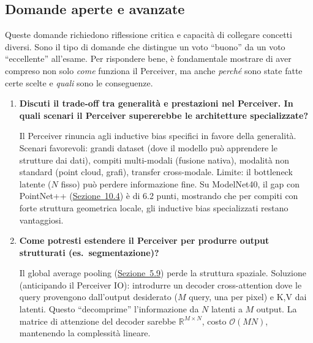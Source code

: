 \documentclass[12pt,a4paper]{article}
\begin{document}
\subsection{Domande aperte e avanzate} \label{sec:domande_aperte}

Queste domande richiedono riflessione critica e capacit\`a di collegare concetti diversi. Sono il tipo di domande che distingue un voto ``buono'' da un voto ``eccellente'' all'esame. Per rispondere bene, \`e fondamentale mostrare di aver compreso non solo \emph{come} funziona il Perceiver, ma anche \emph{perch\'e} sono state fatte certe scelte e \emph{quali} sono le conseguenze.

\begin{enumerate}[resume, label=\textbf{D\arabic*.}]

\item \textbf{Discuti il trade-off tra generalit\`a e prestazioni nel Perceiver. In quali scenari il Perceiver supererebbe le architetture specializzate?}

\begin{proofbox}
Il Perceiver rinuncia agli inductive bias specifici in favore della generalit\`a. Scenari favorevoli: grandi dataset (dove il modello pu\`o apprendere le strutture dai dati), compiti multi-modali (fusione nativa), modalit\`a non standard (point cloud, grafi), transfer cross-modale. Limite: il bottleneck latente ($N$ fisso) pu\`o perdere informazione fine. Su ModelNet40, il gap con PointNet++ (\hyperref[sec:modelnet]{Sezione~10.4}) \`e di 6.2 punti, mostrando che per compiti con forte struttura geometrica locale, gli inductive bias specializzati restano vantaggiosi.
\end{proofbox}

\item \textbf{Come potresti estendere il Perceiver per produrre output strutturati (es.\ segmentazione)?}

\begin{proofbox}
Il global average pooling (\hyperref[sec:pooling]{Sezione~5.9}) perde la struttura spaziale. Soluzione (anticipando il Perceiver IO): introdurre un decoder cross-attention dove le query provengono dall'output desiderato ($M$ query, una per pixel) e K,V dai latenti. Questo ``decomprime'' l'informazione da $N$ latenti a $M$ output. La matrice di attenzione del decoder sarebbe $\mathbb{R}^{M \times N}$, costo $\mathcal{O}(MN)$, mantenendo la complessit\`a lineare.
\end{proofbox}


\end{enumerate}
\end{document}
